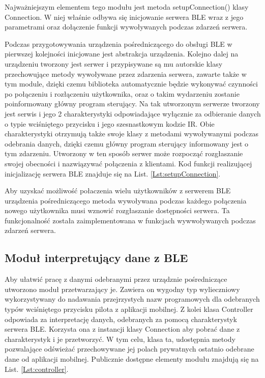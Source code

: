 \documentclass[12pt,twoside,draft]{article}
\begin{document}


Najważniejszym elementem tego modułu jest metoda setupConnection() klasy Connection. W niej właśnie odbywa się inicjowanie serwera BLE wraz z jego parametrami oraz dołączenie funkcji wywoływanych podczas zdarzeń serwera.

Podczas przygotowywania urządzenia pośredniczącego do obsługi BLE w pierwszej kolejności inicjowane jest abstrakcja urządzenia. Kolejno dalej na urządzeniu tworzony jest serwer i przypisywane są mu autorskie klasy przechowujące metody wywoływane przez zdarzenia serwera, zawarte także w tym module, dzięki czemu biblioteka automatycznie będzie wykonywać czynności po połączeniu i rozłączeniu użytkownika, oraz o takim wydarzeniu zostanie poinformowany główny program sterujący.
Na tak utworzonym serwerze tworzony jest serwis i jego 2 charakterystyki odpowiadające wyłącznie za odbieranie danych o typie wciśniętego przycisku i jego szesnastkowym kodzie IR. Obie charakterystyki otrzymują także swoje klasy z metodami wywoływanymi podczas odebrania danych, dzięki czemu główny program sterujący informowany jest o tym zdarzeniu. Utworzony w ten sposób serwer może rozpocząć rozgłaszanie swojej obecności i nazwiązywać połączenia z klientami. Kod funkcji realizującej inicjalizację serwera BLE znajduje się na List. \ref*{Lst:setupConnection}.



Aby uzyskać możliwość połaczenia wielu użytkowników z serwerem BLE urządzenia pośredniczącego metoda wywoływana podczas każdego połączenia nowego użytkownika musi wznowić rozgłaszanie dostępności serwera. Ta funkcjonalność została zaimplementowana w funkcjach wywwoływanych podczas zdarzeń serwera.
\subsection{Moduł interpretujący dane z BLE}
Aby ułatwić pracę z danymi odebranymi przez urządznie pośredniczące utworzono moduł przetwarzający je. Zawiera on wygodny typ wylieczniowy wykorzystywany do nadawania przejrzystych nazw programowych dla odebranych typów wciśniętego przycisku pilota z aplikacji mobilnej.
Z kolei klasa Controller odpowiada za interpretację danych, odebranych za pomocą charakterystyk serwera BLE. Korzysta ona z instancji klasy Connection aby pobrać dane z charakterystyk i je przetworzyć. W tym celu, klasa ta, udostępnia metody pozwalające odświeżać przechowywane jej polach prywatnych ostatnio odebrane dane od aplikacji mobilnej. Publicznie dostępne elementy modułu znajdują się na List. \ref*{Lst:controller}.
\end{document}
